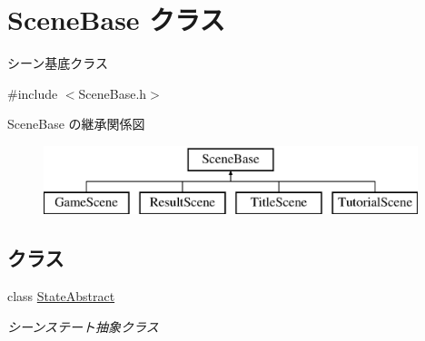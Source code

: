 \hypertarget{class_scene_base}{}\section{Scene\+Base クラス}
\label{class_scene_base}


シーン基底クラス  




{\ttfamily \#include $<$Scene\+Base.\+h$>$}

Scene\+Base の継承関係図\begin{figure}[H]
\begin{center}
\leavevmode
\includegraphics[height=2.000000cm]{class_scene_base}
\end{center}
\end{figure}
\subsection*{クラス}
\begin{DoxyCompactItemize}
\item 
class \mbox{\hyperlink{class_scene_base_1_1_state_abstract}{State\+Abstract}}
\begin{DoxyCompactList}\small\item\em シーンステート抽象クラス \end{DoxyCompactList}\end{DoxyCompactItemize}
